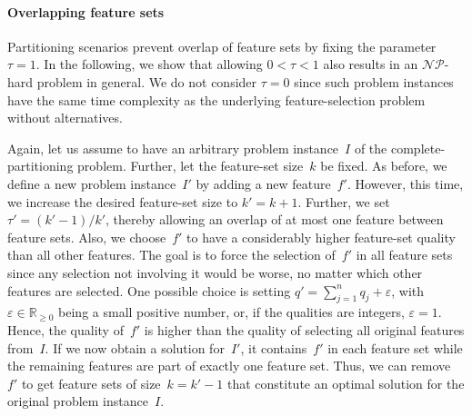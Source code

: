 \documentclass{article}
\theoremstyle{definition}
\begin{document}
\paragraph{Overlapping feature sets}

Partitioning scenarios prevent overlap of feature sets by fixing the parameter~$\tau = 1$.
In the following, we show that allowing $0 < \tau < 1$ also results in an $\mathcal{NP}$-hard problem in general.
We do not consider $\tau = 0$ since such problem instances have the same time complexity as the underlying feature-selection problem without alternatives.

Again, let us assume to have an arbitrary problem instance~$I$ of the complete-partitioning problem.
Further, let the feature-set size~$k$ be fixed.
As before, we define a new problem instance~$I'$ by adding a new feature~$f'$.
However, this time, we increase the desired feature-set size to $k' = k + 1$.
Further, we set $\tau' = (k' - 1) / k'$, thereby allowing an overlap of at most one feature between feature sets.
Also, we choose~$f'$ to have a considerably higher feature-set quality than all other features.
The goal is to force the selection of~$f'$ in all feature sets since any selection not involving it would be worse, no matter which other features are selected.
One possible choice is setting $q' = \sum_{j=1}^n q_j + \varepsilon$, with $\varepsilon \in \mathbb{R}_{\geq 0}$ being a small positive number, or, if the qualities are integers, $\varepsilon = 1$.
Hence, the quality of~$f'$ is higher than the quality of selecting all original features from~$I$.
If we now obtain a solution for~$I'$, it contains~$f'$ in each feature set while the remaining features are part of exactly one feature set.
Thus, we can remove~$f'$ to get feature sets of size~$k = k' - 1$ that constitute an optimal solution for the original problem instance~$I$.
\end{document}
